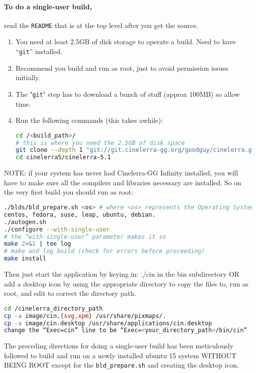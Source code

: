 \paragraph{To do a single-user build,} read the \texttt{README} that is at the top level after you get the source.
\begin{enumerate}
    \item  You need at least 2.5GB of disk storage to operate a build. Need to have “\texttt{git}” installed.
    \item  Recommend you build and run as root, just to avoid permission issues initially.
    \item  The "\texttt{git}" step has to download a bunch of stuff (approx 100MB) so allow time.
    \item  Run the following commands (this takes awhile):
        \begin{lstlisting}[language=bash]
cd /<build_path>/
# this is where you need the 2.5GB of disk space
git clone --depth 1 "git://git.cinelerra-gg.org/goodguy/cinelerra.git" cinelerra5
cd cinelerra5/cinelerra-5.1
        \end{lstlisting}
\end{enumerate}
NOTE: if your system has never had Cinelerra-GG Infinity installed, you will have to make sure all
the compilers and libraries necessary are installed. So on the very first build you should run as root:
\begin{lstlisting}[language=bash]
./blds/bld_prepare.sh <os> # where <os> represents the Operating System of
centos, fedora, suse, leap, ubuntu, debian.
./autogen.sh
./configure --with-single-user
# the “with-single-user” parameter makes it so
make 2>&1 | tee log
# make and log build (check for errors before proceeding)
make install
\end{lstlisting}

Then just start the application by keying in: ./cin in the bin subdirectory OR add a desktop icon by
using the appropriate directory to copy the files to, run as root, and edit to correct the directory path.

\begin{lstlisting}[language=bash]
cd /cinelerra_directory_path
cp -a image/cin.{svg,xpm} /usr/share/pixmaps/.
cp -a image/cin.desktop /usr/share/applications/cin.desktop
change the “Exec=cin” line to be “Exec=<your_directory_path>/bin/cin”
\end{lstlisting}

The preceding directions for doing a single-user build has been meticulously followed to build and run
on a newly installed ubuntu 15 system WITHOUT BEING ROOT except for the \texttt{bld\_prepare.sh} and creating the desktop icon.
